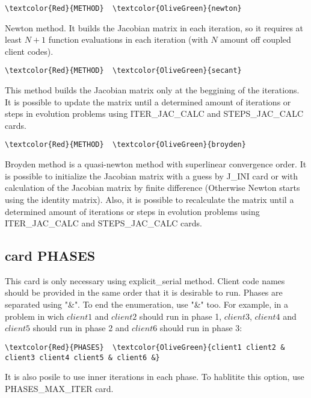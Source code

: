\begin{Verbatim}[frame=single,commandchars=\\\{\}]
\textcolor{Red}{METHOD}  \textcolor{OliveGreen}{newton} 
\end{Verbatim}
Newton method. It builds the Jacobian matrix in each iteration, so it requires at least $N+1$ function evaluations in each iteration (with $N$ amount off coupled client codes).

\begin{Verbatim}[frame=single,commandchars=\\\{\}]
\textcolor{Red}{METHOD}  \textcolor{OliveGreen}{secant} 
\end{Verbatim}
This method builds the Jacobian matrix only at the beggining of the iterations. It is possible to update the matrix until a determined amount of iterations or steps in evolution problems using ITER_JAC_CALC and STEPS_JAC_CALC cards.

\begin{Verbatim}[frame=single,commandchars=\\\{\}]
\textcolor{Red}{METHOD}  \textcolor{OliveGreen}{broyden}
\end{Verbatim}
Broyden method is a quasi-newton method with superlinear convergence order. It is possible to initialize the Jacobian matrix with a guess by J_INI card or with calculation of the Jacobian matrix by finite difference (Otherwise Newton starts using the identity matrix). Also, it is possible to recalculate the matrix until a determined amount of iterations or steps in evolution problems using ITER_JAC_CALC and STEPS_JAC_CALC cards.

\subsection{card PHASES}
This card is only necessary using explicit_serial method. Client code names should be provided in the same order that it is desirable to run. Phases are separated using "\&". To end the enumeration, use "\&" too. For example, in a problem in wich $client1$ and $client2$ should run in phase 1, $client3$, $client4$ and $client5$ should run in phase 2 and $client6$ should run in phase 3:
\begin{Verbatim}[frame=single,commandchars=\\\{\}]
\textcolor{Red}{PHASES}  \textcolor{OliveGreen}{client1 client2 & client3 client4 client5 & client6 &}
\end{Verbatim}
It is also posile to use inner iterations in each phase. To hablitite this option, use PHASES_MAX_ITER card.

